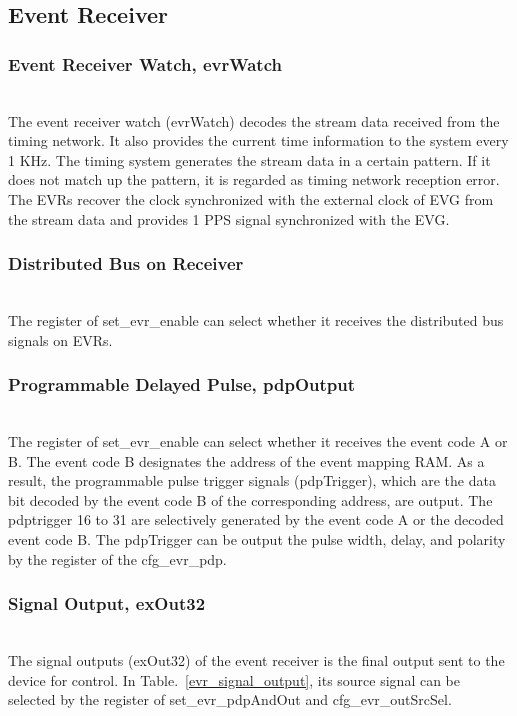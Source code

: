 \documentclass[journal,reqno]{IEEEtran}
\begin{document}
\subsection{Event Receiver}
\subsubsection{Event Receiver Watch, evrWatch}\hspace*{\fill} \\
The event receiver watch (evrWatch) decodes the stream data received from the timing network. It also provides the current time information to the system every 1 KHz.
The timing system generates the stream data in a certain pattern. If it does not match up the pattern, it is regarded as timing network reception error. The EVRs recover the clock synchronized with the external clock of EVG from the stream data and provides 1 PPS signal synchronized with the EVG.\newline

\subsubsection{Distributed Bus on Receiver }\hspace*{\fill} \\
The register of set\_evr\_enable can select whether it receives the distributed bus signals on EVRs. \newline

\subsubsection{Programmable Delayed Pulse, pdpOutput}\hspace*{\fill} \\
The register of set\_evr\_enable can select whether it receives the event code A or B. The event code B designates the address of the event mapping RAM. As a result, the programmable pulse trigger signals (pdpTrigger), which are the data bit decoded by the event code B of the corresponding address, are output. The pdptrigger 16 to 31 are selectively generated by the event code A or the decoded event code B. The pdpTrigger can be output the pulse width, delay, and polarity by the register of the cfg\_evr\_pdp.\newline

\subsubsection{Signal Output, exOut32}\hspace*{\fill} \\
The signal outputs (exOut32) of the event receiver is the final output sent to the device for control. In Table.~\ref*{evr_signal_output}, its source signal can be selected by the register of set\_evr\_pdpAndOut and cfg\_evr\_outSrcSel.
\end{document}
